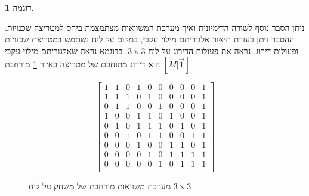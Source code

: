 \documentclass[12pt,leqno]{article}
\theoremstyle{theoremdd}
\newtheorem{example}{דוגמה}[section]
\begin{document}
\begin{example}
\end{example}


ניתן הסבר נוסף לשורה הדימיונית
ואיך
מערכת המשוואות מצתמצמת
ביחס למטריצה שכנויות.
ההסבר ניתן בעזרת תיאור אלגוריתם מילוי עקבי,
במקום על לוח נשתמש במטריצת שכנויות ופעולות דירוג.
נראה את פעולות הדירוג על לוח 
$3 \times 3$.
בדוגמא נראה 
שאלגוריתם מילוי עקבי הוא דירוג מתוחכם של מטריצה
באיור 
\ref{fig: full matrix 3 x 3}
מורחבת 
$[M | \vec{1}]$.

\begin{figure}[ht]
    \caption{
        מערכת משוואות מורחבת של משחק על לוח 
        $3 \times 3$
    }
    \label{fig: full matrix 3 x 3}
    \begin{english}
        \begin{center}
            \[\left[
            \begin{array}{ccccccccc|c}
                    1& 1& 0& 1& 0& 0& 0& 0& 0& 1 \\
                    1& 1& 1& 0& 1& 0& 0& 0& 0& 1 \\
                    0& 1& 1& 0& 0& 1& 0& 0& 0& 1 \\
                    1& 0& 0& 1& 1& 0& 1& 0& 0& 1 \\
                    0& 1& 0& 1& 1& 1& 0& 1& 0& 1 \\
                    0& 0& 1& 0& 1& 1& 0& 0& 1& 1 \\
                    0& 0& 0& 1& 0& 0& 1& 1& 0& 1 \\
                    0& 0& 0& 0& 1& 0& 1& 1& 1& 1 \\
                    0& 0& 0& 0& 0& 1& 0& 1& 1& 1 \\
            \end{array}
            \right]\]
        \end{center}
    \end{english}
\end{figure}
\end{document}
